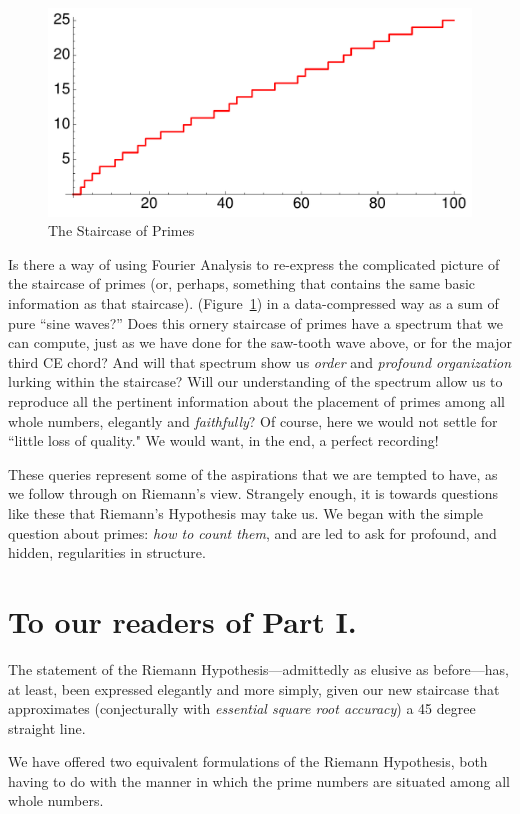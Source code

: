\documentclass[11pt]{article}
\theoremstyle{plain}
\theoremstyle{definition}
\numberwithin{equation}{section}
\numberwithin{figure}{section}
\numberwithin{table}{section}
\begin{document}
\begin{figure}[htbp]
\begin{center}
\includegraphics[width=.35\textwidth]{illustrations/PN_100}
\caption{The Staircase of Primes\label{fig:staircase100}}
\end{center}
\end{figure}

Is there a way of using Fourier Analysis to re-express the complicated
picture of the staircase of primes (or, perhaps, something
  that contains the same basic information as that staircase).
(Figure~\ref{fig:staircase100}) in a data-compressed way as a sum of
pure ``sine waves?''  Does this ornery staircase of primes have a
spectrum that we can compute, just as we have done for the saw-tooth
wave above, or for the major third CE chord?  And will that spectrum
show us {\em order} and {\em profound organization} lurking within the
staircase?  Will our understanding of the spectrum allow us to
reproduce all the pertinent information about the placement of primes
among all whole numbers, elegantly and {\em faithfully}?  Of course,
here we would not settle for ``little loss of quality." We would want,
in the end, a perfect recording!
  
 
These queries represent some of the aspirations that we are tempted to
have, as we follow through on Riemann's view. Strangely enough, it is
towards questions like these that Riemann's Hypothesis may take us. We
began with the simple question about primes: {\em how to count them},
and are led to ask for profound, and hidden, regularities in
structure.

\section{ To our readers of Part I. } 
The statement of the Riemann Hypothesis---admittedly as elusive as
before---has, at least, been expressed elegantly and more simply,
given our new staircase that approximates (conjecturally with {\em
  essential square root accuracy}) a 45 degree straight line.
   
We have offered two equivalent formulations of the Riemann Hypothesis,
both having to do with the manner in which the prime numbers are
situated among all whole numbers.
\end{document}

